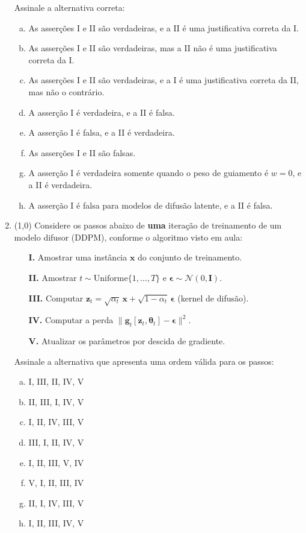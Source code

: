 \documentclass[11pt,a4paper]{article}
\newcommand{\thetav}{\boldsymbol{\theta}}
\begin{document}
\begin{enumerate}[1)]
Assinale a alternativa correta:
\begin{enumerate}[a)]
    \item As asserções I e II são verdadeiras, e a II é uma justificativa correta da I.
    \item As asserções I e II são verdadeiras, mas a II não é uma justificativa correta da I.
    \item As asserções I e II são verdadeiras, e a I é uma justificativa correta da II, mas não o contrário.
    \item A asserção I é verdadeira, e a II é falsa.
    \item A asserção I é falsa, e a II é verdadeira.
    \item As asserções I e II são falsas.
    \item A asserção I é verdadeira somente quando o peso de guiamento é $w = 0$, e a II é verdadeira.
    \item A asserção I é falsa para modelos de difusão latente, e a II é falsa.
\end{enumerate}

\item (1{,}0) Considere os passos abaixo de \textbf{uma} iteração de treinamento de um modelo difusor (DDPM), conforme o algoritmo visto em aula:

\begin{itemize}
    \item[\textbf{I.}] Amostrar uma instância $\mathbf{x}$ do conjunto de treinamento.
    \item[\textbf{II.}] Amostrar $t \sim \mathrm{Uniforme}\{1, \dots, T\}$ e $\boldsymbol{\epsilon} \sim \mathcal{N}(0, \mathbf{I})$.
    \item[\textbf{III.}] Computar $\mathbf{z}_t = \sqrt{\alpha_t}\,\mathbf{x} + \sqrt{1 - \alpha_t}\,\boldsymbol{\epsilon}$ (kernel de difusão).
    \item[\textbf{IV.}] Computar a perda $\lVert \mathbf{g}_t[\mathbf{z}_t, \thetav_t] - \boldsymbol{\epsilon}\rVert^{2}$.
    \item[\textbf{V.}] Atualizar os parâmetros por descida de gradiente.
\end{itemize}

Assinale a alternativa que apresenta uma ordem válida para os passos:
\begin{enumerate}[a)]
    \item I, III, II, IV, V
    \item II, III, I, IV, V
    \item I, II, IV, III, V
    \item III, I, II, IV, V
    \item I, II, III, V, IV
    \item V, I, II, III, IV
    \item II, I, IV, III, V
    \item I, II, III, IV, V
\end{enumerate}


\end{enumerate}
\end{document}
